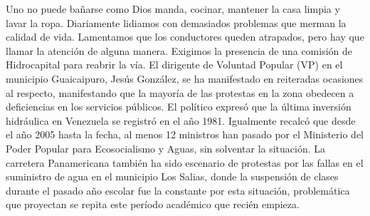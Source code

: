 \documentclass{article}%
\begin{document}
\newline%
%
Uno no puede bañarse como Dios manda, cocinar, mantener la casa limpia y lavar la ropa. Diariamente lidiamos con demasiados problemas que merman la calidad de vida. Lamentamos que los conductores queden atrapados, pero hay que llamar la atención de alguna manera. Exigimos la presencia de una comisión de Hidrocapital para reabrir la vía.%
\newline%
%
El dirigente de Voluntad Popular (VP) en el municipio Guaicaipuro, Jesús González, se ha manifestado en reiteradas ocasiones  al respecto, manifestando que la mayoría de las protestas en la zona obedecen a deficiencias en los servicios públicos.%
\newline%
%
El político expresó que la última inversión hidráulica en Venezuela se registró en el año 1981. Igualmente recalcó que desde el año 2005 hasta la fecha, al menos 12 ministros han pasado por el Ministerio del Poder Popular para Ecosocialismo y Aguas, sin solventar la situación.%
\newline%
%
La carretera Panamericana también ha sido escenario de protestas por las fallas en el suministro de agua en el municipio Los Salias, donde la suspensión de clases durante el pasado año escolar fue la constante por esta situación, problemática que proyectan se repita este período académico que recién empieza.%
\newline%
%
\end{document}
